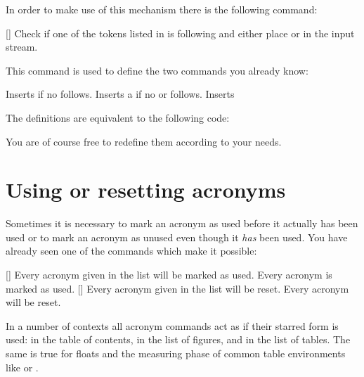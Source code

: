\documentclass{acro-manual}
\begin{document}
In order to make use of this mechanism there is the following command:
\begin{commands}
  \expandable{}[]
    Check if one of the tokens listed in  is
    following and either place  or  in the input
    stream.
\end{commands}
This command is used to define the two commands you already know:
\begin{commands}
  \expandable{} Inserts  if no  follows.
  \expandable{} Inserts a  if no  or
     follows.
  \expandable{} Inserts 
\end{commands}
The definitions are equivalent to the following code:
\begin{sourcecode}
  \newcommand*\acdot{\aciftrailing{dot}{}{\abbrdot}}
  \newcommand*\acspace{\aciftrailing{dash,babel-hyphen}{}{\space}}
\end{sourcecode}
You are of course free to redefine them according to your needs.

\section{Using or resetting acronyms}\label{sec:using-or-resetting}
Sometimes it is necessary to mark an acronym as used before it actually has
been used or to mark an acronym as unused even though it \emph{has} been
used.  You have already seen one of the commands which make it possible:
\begin{commands}
  []
    Every acronym given in the list will be marked as used.
    Every acronym is marked as used.
  []
    Every acronym given in the list will be reset.
    Every acronym will be reset.
\end{commands}

\begin{bewareofthedog}
  In a number of contexts all acronym commands act as if their starred form is
  used: in the table of contents, in the list of figures, and in the list of
  tables.  The same is true for floats and the measuring phase of common
  table environments like  or .
\end{bewareofthedog}
\end{document}
